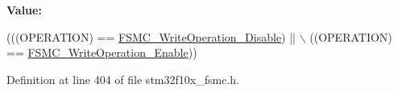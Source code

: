 {\bfseries Value\+:}
\begin{DoxyCode}
(((OPERATION) == \hyperlink{group___f_s_m_c___write___operation_ga74176320484248f06abae854170f9d9f}{FSMC\_WriteOperation\_Disable}) || \(\backslash\)
                                            ((OPERATION) == 
      \hyperlink{group___f_s_m_c___write___operation_ga2478beb6dd8861b34a16b8a57a795e56}{FSMC\_WriteOperation\_Enable}))
\end{DoxyCode}


Definition at line 404 of file stm32f10x\+\_\+fsmc.\+h.

